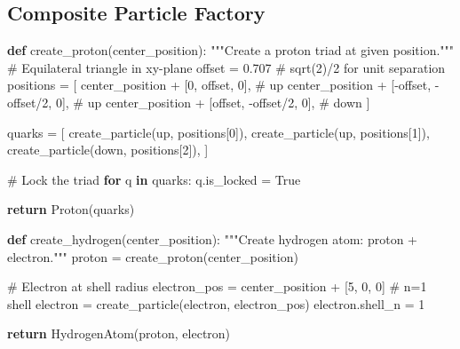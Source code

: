 \documentclass[
  11pt,
  letterpaper,
  twoside,
  openany]{book}
\makeatletter
\newenvironment{Shaded}{\begin{snugshade}}{\end{snugshade}}
\newcommand{\CommentTok}[1]{\textcolor[rgb]{0.37,0.37,0.37}{#1}}
\newcommand{\ControlFlowTok}[1]{\textcolor[rgb]{0.00,0.23,0.31}{\textbf{#1}}}
\newcommand{\DecValTok}[1]{\textcolor[rgb]{0.68,0.00,0.00}{#1}}
\newcommand{\FloatTok}[1]{\textcolor[rgb]{0.68,0.00,0.00}{#1}}
\newcommand{\KeywordTok}[1]{\textcolor[rgb]{0.00,0.23,0.31}{\textbf{#1}}}
\newcommand{\NormalTok}[1]{\textcolor[rgb]{0.00,0.23,0.31}{#1}}
\newcommand{\OperatorTok}[1]{\textcolor[rgb]{0.37,0.37,0.37}{#1}}
\newcommand{\StringTok}[1]{\textcolor[rgb]{0.13,0.47,0.30}{#1}}
\newcommand{\VariableTok}[1]{\textcolor[rgb]{0.07,0.07,0.07}{#1}}
\let\orig@subsection\subsection
\renewcommand{\subsection}{\needspace{6\baselineskip}\orig@subsection}
\makeatother
\begin{document}
\subsection{Composite Particle
Factory}\label{composite-particle-factory}

\begin{Shaded}
\begin{Highlighting}[]
\KeywordTok{def}\NormalTok{ create\_proton(center\_position):}
    \CommentTok{"""Create a proton triad at given position."""}
    \CommentTok{\# Equilateral triangle in xy{-}plane}
\NormalTok{    offset }\OperatorTok{=} \FloatTok{0.707}  \CommentTok{\# sqrt(2)/2 for unit separation}
\NormalTok{    positions }\OperatorTok{=}\NormalTok{ [}
\NormalTok{        center\_position }\OperatorTok{+}\NormalTok{ [}\DecValTok{0}\NormalTok{, offset, }\DecValTok{0}\NormalTok{],      }\CommentTok{\# up}
\NormalTok{        center\_position }\OperatorTok{+}\NormalTok{ [}\OperatorTok{{-}}\NormalTok{offset, }\OperatorTok{{-}}\NormalTok{offset}\OperatorTok{/}\DecValTok{2}\NormalTok{, }\DecValTok{0}\NormalTok{],  }\CommentTok{\# up}
\NormalTok{        center\_position }\OperatorTok{+}\NormalTok{ [offset, }\OperatorTok{{-}}\NormalTok{offset}\OperatorTok{/}\DecValTok{2}\NormalTok{, }\DecValTok{0}\NormalTok{],   }\CommentTok{\# down}
\NormalTok{    ]}

\NormalTok{    quarks }\OperatorTok{=}\NormalTok{ [}
\NormalTok{        create\_particle(}\StringTok{\textquotesingle{}up\textquotesingle{}}\NormalTok{, positions[}\DecValTok{0}\NormalTok{]),}
\NormalTok{        create\_particle(}\StringTok{\textquotesingle{}up\textquotesingle{}}\NormalTok{, positions[}\DecValTok{1}\NormalTok{]),}
\NormalTok{        create\_particle(}\StringTok{\textquotesingle{}down\textquotesingle{}}\NormalTok{, positions[}\DecValTok{2}\NormalTok{]),}
\NormalTok{    ]}

    \CommentTok{\# Lock the triad}
    \ControlFlowTok{for}\NormalTok{ q }\KeywordTok{in}\NormalTok{ quarks:}
\NormalTok{        q.is\_locked }\OperatorTok{=} \VariableTok{True}

    \ControlFlowTok{return}\NormalTok{ Proton(quarks)}

\KeywordTok{def}\NormalTok{ create\_hydrogen(center\_position):}
    \CommentTok{"""Create hydrogen atom: proton + electron."""}
\NormalTok{    proton }\OperatorTok{=}\NormalTok{ create\_proton(center\_position)}

    \CommentTok{\# Electron at shell radius}
\NormalTok{    electron\_pos }\OperatorTok{=}\NormalTok{ center\_position }\OperatorTok{+}\NormalTok{ [}\DecValTok{5}\NormalTok{, }\DecValTok{0}\NormalTok{, }\DecValTok{0}\NormalTok{]  }\CommentTok{\# n=1 shell}
\NormalTok{    electron }\OperatorTok{=}\NormalTok{ create\_particle(}\StringTok{\textquotesingle{}electron\textquotesingle{}}\NormalTok{, electron\_pos)}
\NormalTok{    electron.shell\_n }\OperatorTok{=} \DecValTok{1}

    \ControlFlowTok{return}\NormalTok{ HydrogenAtom(proton, electron)}
\end{Highlighting}
\end{Shaded}
\end{document}
